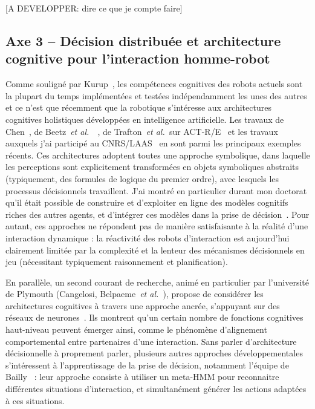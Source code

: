 \documentclass[a4paper]{article}
\newcommand{\etal}{{\textit{et al.~}}}
\begin{document}
[A DEVELOPPER: dire ce que je compte faire]

\subsection*{Axe 3 -- Décision distribuée et architecture cognitive pour l'interaction homme-robot}

Comme souligné par Kurup~\cite{kurup2012what}, les compétences cognitives des
robots actuels sont la plupart du temps implémentées et testées indépendamment
les unes des autres et ce n'est que récemment que la robotique s'intéresse aux
architectures cognitives holistiques développées en intelligence artificielle.
Les travaux de Chen~\cite{Chen2010}, de Beetz~\etal~\cite{Beetz2010}, de
Trafton~\etal sur ACT-R/E~\cite{trafton2013act} et les travaux auxquels j'ai
participé au CNRS/LAAS~\cite{lemaignan2015human} en sont parmi les principaux
exemples récents. Ces architectures adoptent toutes une approche symbolique,
dans laquelle les perceptions sont explicitement transformées en objets
symboliques abstraits (typiquement, des formules de logique du premier ordre),
avec lesquels les processus décisionnels travaillent. J'ai montré en particulier
durant mon doctorat qu'il était possible de construire et d'exploiter en ligne
des modèles cognitifs riches des autres agents, et d'intégrer ces modèles dans
la prise de décision~\cite{alami2011when, warnier2012when, lemaignan2015human}.
Pour autant, ces approches ne répondent pas de manière satisfaisante à la
réalité d'une interaction dynamique : la réactivité des robots d'interaction est
aujourd'hui clairement limitée par la complexité et la lenteur des mécanismes
décisionnels en jeu (nécessitant typiquement raisonnement et planification).

En parallèle, un second courant de recherche, animé en particulier par
l'université de Plymouth (Cangelosi, Belpaeme~\etal), propose de considérer les
architectures cognitives à travers une approche
ancrée, s'appuyant sur des réseaux de neurones~\cite{morse2010epigenetic,
baxter2013cognitive}. Ils montrent qu'un certain nombre de fonctions cognitives
haut-niveau peuvent émerger ainsi, comme le phénomène d'alignement
comportemental entre partenaires d'une interaction.
Sans parler d'architecture décisionnelle à proprement parler, plusieurs autres
approches développementales s'intéressent à l'apprentissage de la prise de
décision, notamment l'équipe de Bailly~\cite{mihoub2014modeling} : leur approche
consiste à utiliser un meta-HMM pour reconnaitre différentes situations
d'interaction, et simultanément générer les actions adaptées à ces situations.
\end{document}
